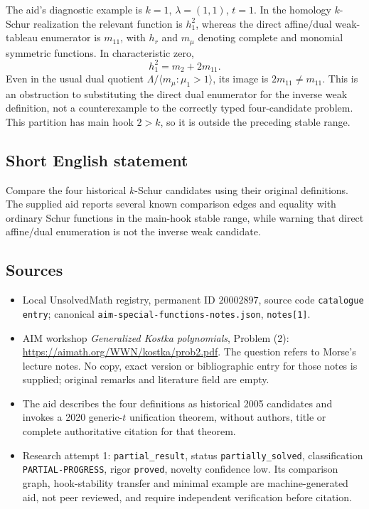 \documentclass[11pt]{article}
\begin{document}
The aid's diagnostic example is $k=1$, $\lambda=(1,1)$, $t=1$. In the homology $k$-Schur realization the relevant function is $h_1^2$, whereas the direct affine/dual weak-tableau enumerator is $m_{11}$, with $h_r$ and $m_\mu$ denoting complete and monomial symmetric functions. In characteristic zero,
\[
h_1^2=m_2+2m_{11}.
\]
Even in the usual dual quotient $\Lambda/\langle m_\mu:\mu_1>1\rangle$, its image is $2m_{11}\ne m_{11}$. This is an obstruction to substituting the direct dual enumerator for the inverse weak definition, not a counterexample to the correctly typed four-candidate problem. This partition has main hook $2>k$, so it is outside the preceding stable range.
\subsection{Short English statement}
Compare the four historical $k$-Schur candidates using their original definitions. The supplied aid reports several known comparison edges and equality with ordinary Schur functions in the main-hook stable range, while warning that direct affine/dual enumeration is not the inverse weak candidate.
\subsection{Sources}
\begin{itemize}
\item Local UnsolvedMath registry, permanent ID $20002897$, source code \texttt{catalogue entry}; canonical \texttt{aim-special-functions-notes.json}, \texttt{notes[1]}.
\item AIM workshop \emph{Generalized Kostka polynomials}, Problem (2): \url{https://aimath.org/WWN/kostka/prob2.pdf}. The question refers to Morse's lecture notes. No copy, exact version or bibliographic entry for those notes is supplied; original remarks and literature field are empty.
\item The aid describes the four definitions as historical 2005 candidates and invokes a 2020 generic-$t$ unification theorem, without authors, title or complete authoritative citation for that theorem.
\item Research attempt 1: \texttt{partial\_result}, status \texttt{partially\_solved}, classification \texttt{PARTIAL-PROGRESS}, rigor \texttt{proved}, novelty confidence low. Its comparison graph, hook-stability transfer and minimal example are machine-generated aid, not peer reviewed, and require independent verification before citation.
\end{itemize}
\end{document}
